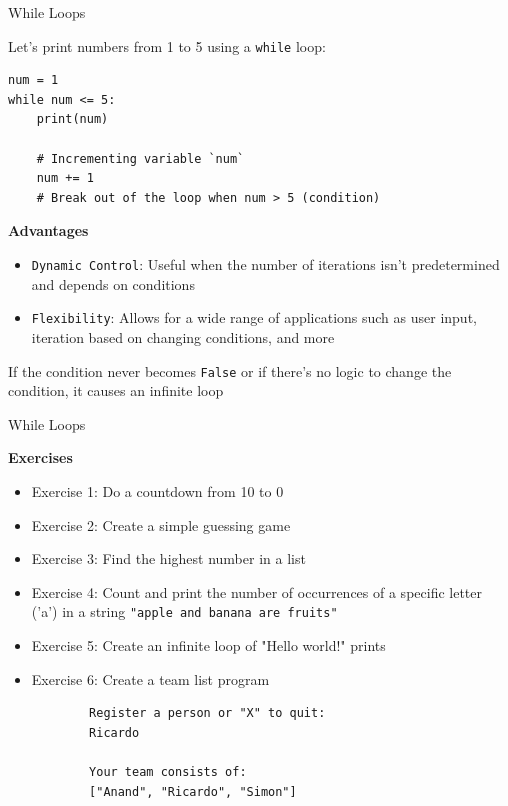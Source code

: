 \documentclass[
	11pt, 
]{beamer}
\begin{document}
\begin{frame}[fragile]{While Loops}

Let's print numbers from 1 to 5 using a \texttt{while} loop:

\begin{verbatim}
num = 1
while num <= 5:
    print(num)
    
    # Incrementing variable `num` 
    num += 1 
    # Break out of the loop when num > 5 (condition)
\end{verbatim}

\begin{block}{\textbf{Advantages}}
    \begin{itemize}
        \item \texttt{Dynamic Control}: Useful when the number of iterations isn't predetermined and depends on conditions

        \item \texttt{Flexibility}: Allows for a wide range of applications such as user input, iteration based on changing conditions, and more

    \end{itemize}
\end{block}

 If the condition never becomes \texttt{False} or if there's no logic to change the condition, it causes an infinite loop

\end{frame}


\begin{frame}[fragile]{While Loops}

\begin{alertblock}{\textbf{Exercises}}
\begin{itemize}
    \item Exercise 1: Do a countdown from 10 to 0
    \item Exercise 2: Create a simple guessing game
    \item Exercise 3: Find the highest number in a list
    \item Exercise 4: Count and print the number of occurrences of a specific letter ('a') in a string \texttt{"apple and banana are fruits"}
    \item Exercise 5: Create an infinite loop of "Hello world!" prints
    \item Exercise 6: Create a team list program
    \begin{center}
    \begin{verbatim}
        Register a person or "X" to quit: 
        Ricardo
        
        Your team consists of:
        ["Anand", "Ricardo", "Simon"]
    \end{verbatim}
    \end{center}
\end{itemize}    
\end{alertblock}
\end{frame}
\end{document}
